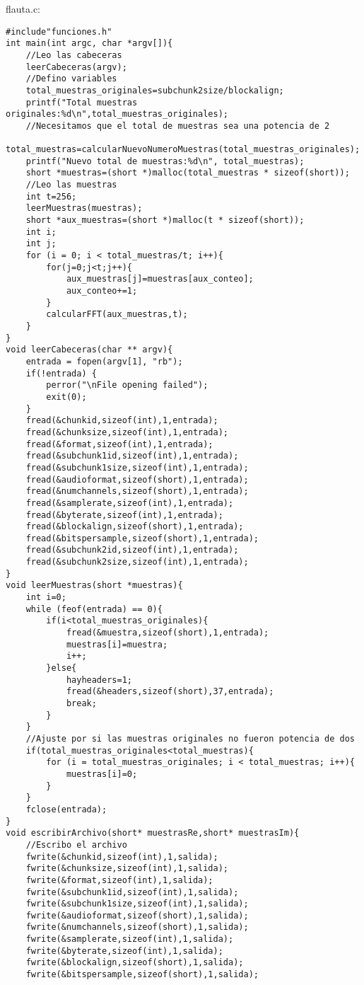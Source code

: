 flauta.c:
\begin{lstlisting}[style=CStyle]
#include"funciones.h"
int main(int argc, char *argv[]){
	//Leo las cabeceras
	leerCabeceras(argv);
	//Defino variables
	total_muestras_originales=subchunk2size/blockalign;
	printf("Total muestras originales:%d\n",total_muestras_originales);
	//Necesitamos que el total de muestras sea una potencia de 2
	total_muestras=calcularNuevoNumeroMuestras(total_muestras_originales);
	printf("Nuevo total de muestras:%d\n", total_muestras);
	short *muestras=(short *)malloc(total_muestras * sizeof(short));
	//Leo las muestras
	int t=256;
	leerMuestras(muestras);
	short *aux_muestras=(short *)malloc(t * sizeof(short));
	int i;
	int j;
	for (i = 0; i < total_muestras/t; i++){
		for(j=0;j<t;j++){
			aux_muestras[j]=muestras[aux_conteo];
			aux_conteo+=1;
		}
		calcularFFT(aux_muestras,t);
	}
}
void leerCabeceras(char ** argv){
	entrada = fopen(argv[1], "rb");
	if(!entrada) {
		perror("\nFile opening failed");
		exit(0);
	}
	fread(&chunkid,sizeof(int),1,entrada);
	fread(&chunksize,sizeof(int),1,entrada);
	fread(&format,sizeof(int),1,entrada);
	fread(&subchunk1id,sizeof(int),1,entrada);
	fread(&subchunk1size,sizeof(int),1,entrada);
	fread(&audioformat,sizeof(short),1,entrada);
	fread(&numchannels,sizeof(short),1,entrada);
	fread(&samplerate,sizeof(int),1,entrada);
	fread(&byterate,sizeof(int),1,entrada);
	fread(&blockalign,sizeof(short),1,entrada);
	fread(&bitspersample,sizeof(short),1,entrada);
	fread(&subchunk2id,sizeof(int),1,entrada);
	fread(&subchunk2size,sizeof(int),1,entrada);
}
void leerMuestras(short *muestras){
	int i=0;
	while (feof(entrada) == 0){
		if(i<total_muestras_originales){
			fread(&muestra,sizeof(short),1,entrada);
			muestras[i]=muestra;
			i++;
		}else{
			hayheaders=1;
			fread(&headers,sizeof(short),37,entrada);
			break;
		}
	}
	//Ajuste por si las muestras originales no fueron potencia de dos
	if(total_muestras_originales<total_muestras){
		for (i = total_muestras_originales; i < total_muestras; i++){
			muestras[i]=0;
		}
	}
	fclose(entrada);
}
void escribirArchivo(short* muestrasRe,short* muestrasIm){
	//Escribo el archivo
	fwrite(&chunkid,sizeof(int),1,salida);
	fwrite(&chunksize,sizeof(int),1,salida);
	fwrite(&format,sizeof(int),1,salida);
	fwrite(&subchunk1id,sizeof(int),1,salida);
	fwrite(&subchunk1size,sizeof(int),1,salida);
	fwrite(&audioformat,sizeof(short),1,salida);
	fwrite(&numchannels,sizeof(short),1,salida);
	fwrite(&samplerate,sizeof(int),1,salida);
	fwrite(&byterate,sizeof(int),1,salida);
	fwrite(&blockalign,sizeof(short),1,salida);
	fwrite(&bitspersample,sizeof(short),1,salida);

\end{lstlisting}

